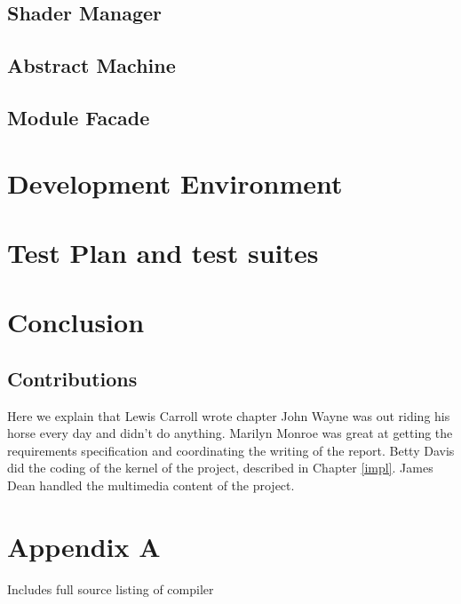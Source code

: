 \documentclass{l3proj}
\begin{document}
\section{Shader Manager}
\label{arch-shad}

\section{Abstract Machine}
\label{arch-abs}

\section{Module Facade}
\label{arch-module}

\chapter{Development Environment}
\label{dev}

\chapter{Test Plan and test suites}
\label{test}

\chapter{Conclusion}
\label{conc}

\section{Contributions}
\label{cont}
Here we explain that Lewis Carroll wrote chapter  John Wayne
was out riding his horse every day and didn't do anything. Marilyn Monroe
was great at getting the requirements specification and coordinating the
writing of the report. Betty Davis did the coding of the kernel of the
project, described in Chapter \ref{impl}.  James Dean handled the
multimedia content of the project.
\chapter{Appendix A}
\label{appa}

Includes full source listing of compiler




\end{document}
